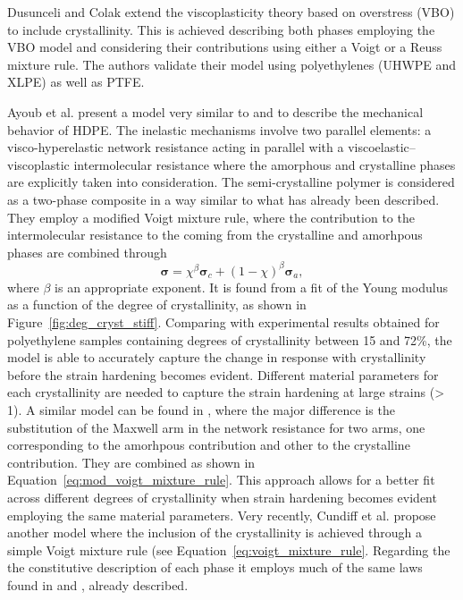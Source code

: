 Dusunceli and Colak \citep{dusunceliModellingEffectsDegree2008} extend the viscoplasticity theory based on overstress (VBO) to include crystallinity.
This is achieved describing both phases employing the VBO model and considering their contributions using either a Voigt or a Reuss mixture rule.
The authors validate their model using polyethylenes (UHWPE and XLPE) as well as PTFE.

Ayoub et al. \citep{ayoubModellingLargeDeformation2010, ayoubEffectsCrystalContent2011} present a model very similar to \cite{ahziModelingDeformationBehavior2003} and \cite{boyceConstitutiveModelFinite2000} to describe the mechanical behavior of HDPE.
The inelastic mechanisms involve two parallel elements: a visco-hyperelastic network resistance acting in parallel with a viscoelastic–viscoplastic intermolecular resistance where the amorphous and crystalline phases are explicitly taken into consideration.
The semi-crystalline polymer is considered as a two-phase composite in a way similar to what has already been described.
They employ a modified Voigt mixture rule, where the contribution to the intermolecular resistance to the coming from the crystalline and amorhpous phases are combined through
\begin{equation}
  \label{eq:mod_voigt_mixture_rule}
  \bm \sigma = \chi^\beta \bm \sigma_c + (1-\chi)^\beta \bm \sigma_a,
\end{equation}
where $\beta$ is an appropriate exponent.
It is found from a fit of the Young modulus as a function of the degree of crystallinity, as shown in Figure~\ref{fig:deg_cryst_stiff}.
Comparing with experimental results obtained for polyethylene samples containing degrees of crystallinity between 15 and 72\%, the model is able to accurately capture the change in response with crystallinity before the strain hardening becomes evident.
Different material parameters for each crystallinity are needed to capture the strain hardening at large strains (> 1).
A similar model can be found in \citep{abdul-hameedTwophaseHyperelasticviscoplasticConstitutive2014}, where the major difference is the substitution of the Maxwell arm in the network resistance for two arms, one corresponding to the amorhpous contribution and other to the crystalline contribution.
They are combined as shown in Equation~\eqref{eq:mod_voigt_mixture_rule}.
This approach allows for a better fit across different degrees of crystallinity when strain hardening becomes evident employing the same material parameters.
Very recently, Cundiff et al. \citep{cundiffModelingViscoplasticBehavior2022} propose another model where the inclusion of the crystallinity is achieved through a simple Voigt mixture rule (see Equation~\eqref{eq:voigt_mixture_rule}.
Regarding the the constitutive description of each phase it employs much of the same laws found in \cite{ahziModelingDeformationBehavior2003} and \cite{chowdhuryEffectsManufacturingInducedVoids2008}, already described.


